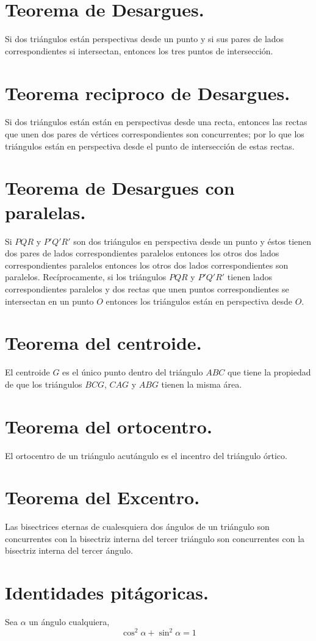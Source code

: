\documentclass[12pt,a4paper]{book}
\begin{document}
\section{Teorema de Desargues.}
Si dos triángulos están perspectivas desde un punto y si sus pares de lados correspondientes si intersectan, entonces los tres puntos de intersección.
\section{Teorema reciproco de Desargues.}
Si dos triángulos están están en perspectivas desde una recta, entonces las rectas que unen dos pares de vértices correspondientes son concurrentes; por lo que los triángulos están en perspectiva desde el punto de intersección de estas rectas.
\section{Teorema de Desargues con paralelas.}
Si $PQR$ y $P'Q'R'$ son dos triángulos  en perspectiva desde un punto y éstos tienen dos pares de lados correspondientes paralelos entonces los otros dos lados correspondientes paralelos entonces los otros dos lados correspondientes son paralelos. Recíprocamente, si los triángulos $PQR$ y $P'Q'R'$ tienen lados correspondientes paralelos y dos rectas que unen puntos correspondientes se intersectan en un punto $O$ entonces los triángulos están en perspectiva desde $O$.
\section{Teorema del centroide.}
El centroide $G$ es el único punto dentro del triángulo $ABC$ que tiene la propiedad de que los triángulos $BCG$, $CAG$ y $ABG$ tienen la misma área.
\section{Teorema del ortocentro.}
El ortocentro de un triángulo acutángulo es el incentro del triángulo órtico.
\section{Teorema del Excentro.}
Las bisectrices eternas de cualesquiera dos ángulos de un triángulo son concurrentes con la bisectriz interna del tercer triángulo son concurrentes con la bisectriz interna del tercer ángulo.
\section{Identidades pitágoricas.}
Sea $\alpha$ un ángulo cualquiera,$$\cos^ 2 \alpha + \sin ^2 \alpha =1$$
\end{document}
